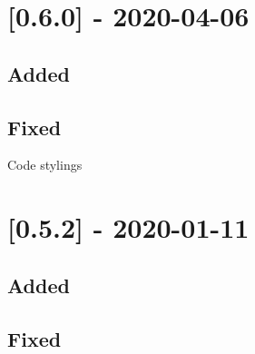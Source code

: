 \begin{shortlist}
    \item {}
    \item {}
    \item {}
\end{shortlist}

\section{[0.6.0] - 2020-04-06}

\subsection{Added}

\begin{shortlist}
    \item {}
    \item {}
    \item {}
    \item {}
    \item {}
\end{shortlist}

\subsection{Fixed}

\begin{shortlist}
    \item Code stylings
\end{shortlist}

\section{[0.5.2] - 2020-01-11}

\subsection{Added}

\begin{shortlist}
    \item {}
\end{shortlist}

\subsection{Fixed}


